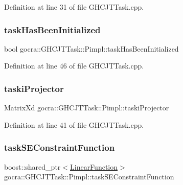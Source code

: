 Definition at line 31 of file G\+H\+C\+J\+T\+Task.\+cpp.

\hypertarget{structgocra_1_1GHCJTTask_1_1Pimpl_ad07475df136dd26fc89634fa6dd9a9b7}{}\label{structgocra_1_1GHCJTTask_1_1Pimpl_ad07475df136dd26fc89634fa6dd9a9b7} 
\subsubsection{\texorpdfstring{task\+Has\+Been\+Initialized}{taskHasBeenInitialized}}
{\footnotesize\ttfamily bool gocra\+::\+G\+H\+C\+J\+T\+Task\+::\+Pimpl\+::task\+Has\+Been\+Initialized}



Definition at line 46 of file G\+H\+C\+J\+T\+Task.\+cpp.

\hypertarget{structgocra_1_1GHCJTTask_1_1Pimpl_a0ae67b26b52f69987d41bc3232636ccb}{}\label{structgocra_1_1GHCJTTask_1_1Pimpl_a0ae67b26b52f69987d41bc3232636ccb} 
\subsubsection{\texorpdfstring{taski\+Projector}{taskiProjector}}
{\footnotesize\ttfamily Matrix\+Xd gocra\+::\+G\+H\+C\+J\+T\+Task\+::\+Pimpl\+::taski\+Projector}



Definition at line 41 of file G\+H\+C\+J\+T\+Task.\+cpp.

\hypertarget{structgocra_1_1GHCJTTask_1_1Pimpl_ab1b71cfa2f203377834f529d2c0e98c3}{}\label{structgocra_1_1GHCJTTask_1_1Pimpl_ab1b71cfa2f203377834f529d2c0e98c3} 
\subsubsection{\texorpdfstring{task\+S\+E\+Constraint\+Function}{taskSEConstraintFunction}}
{\footnotesize\ttfamily boost\+::shared\+\_\+ptr$<$\hyperlink{classocra_1_1LinearFunction}{Linear\+Function}$>$ gocra\+::\+G\+H\+C\+J\+T\+Task\+::\+Pimpl\+::task\+S\+E\+Constraint\+Function}



